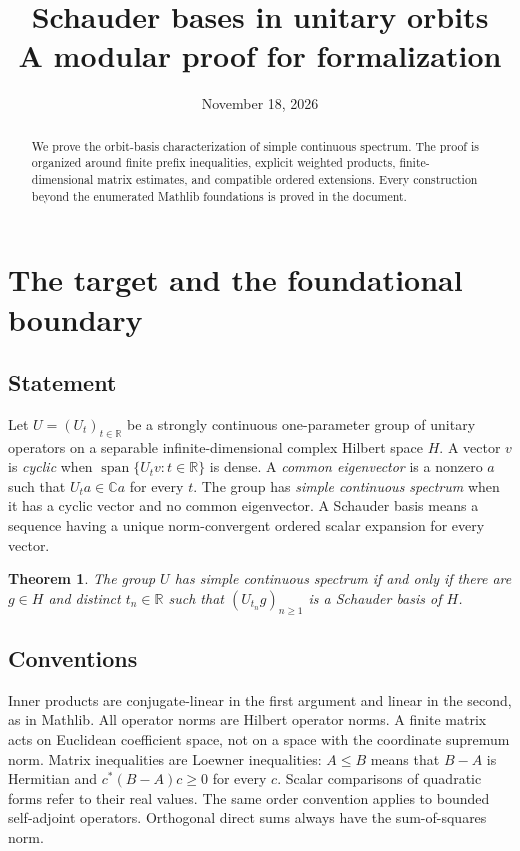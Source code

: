 \documentclass[reqno,a4paper,12pt]{amsart}
\title[Schauder bases in unitary orbits]{Schauder bases in unitary orbits\\A modular proof for formalization}
\date{November 18, 2026}
\newtheorem{theorem}{Theorem}[section]
\theoremstyle{definition}
\newcommand{\R}{\mathbb R}
\newcommand{\C}{\mathbb C}
\newcommand{\spn}{\operatorname{span}}
\begin{document}
\begin{abstract}
We prove the orbit-basis characterization of simple continuous spectrum.
The proof is organized around finite prefix inequalities, explicit
weighted products, finite-dimensional matrix estimates, and compatible
ordered extensions. Every construction beyond the enumerated Mathlib
foundations is proved in the document.
\end{abstract}
\maketitle
\raggedbottom
\begingroup\footnotesize
\tableofcontents
\endgroup
\clearpage

\section{The target and the foundational boundary}
\subsection{Statement}
Let $U=(U_t)_{t\in\R}$ be a strongly continuous one-parameter group of
unitary operators on a separable infinite-dimensional complex Hilbert
space $H$. A vector $v$ is \emph{cyclic} when
$\spn\{U_tv:t\in\R\}$ is dense. A \emph{common eigenvector} is a nonzero
$a$ such that $U_ta\in\C a$ for every $t$. The group has \emph{simple
continuous spectrum} when it has a cyclic vector and no common eigenvector.
A Schauder basis means a sequence having a unique norm-convergent ordered
scalar expansion for every vector.

\begin{theorem}\label{thm:main}
The group $U$ has simple continuous spectrum if and only if there are
$g\in H$ and distinct $t_n\in\R$ such that $(U_{t_n}g)_{n\ge1}$
is a Schauder basis of $H$.
\end{theorem}

\subsection{Conventions}
Inner products are conjugate-linear in the first argument and linear in
the second, as in Mathlib. All operator norms are Hilbert operator norms.
A finite matrix acts on Euclidean coefficient space, not on a space with
the coordinate supremum norm. Matrix inequalities are Loewner
inequalities: $A\le B$ means that $B-A$ is Hermitian and
$c^*(B-A)c\ge0$ for every $c$. Scalar comparisons of quadratic forms
refer to their real values. The same order convention applies to
bounded self-adjoint operators. Orthogonal direct sums always have the
sum-of-squares norm.
\end{document}
